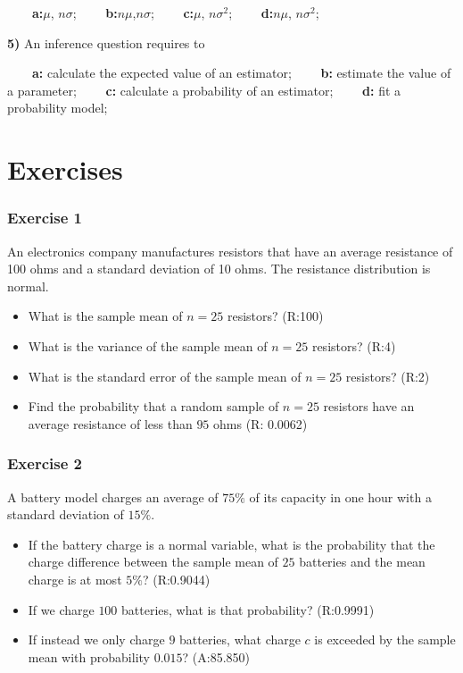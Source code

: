 \documentclass[
]{book}
\begin{document}
\textbf{\(\qquad\)a:}\(\mu\), \(n\sigma\);
\textbf{\(\qquad\)b:}\(n\mu\),\(n\sigma\);
\textbf{\(\qquad\)c:}\(\mu\), \(n\sigma^2\);
\textbf{\(\qquad\)d:}\(n\mu\), \(n\sigma^2\);

\textbf{5)} An inference question requires to

\textbf{\(\qquad\)a:} calculate the expected value of an estimator;
\textbf{\(\qquad\)b:} estimate the value of a parameter;
\textbf{\(\qquad\)c:} calculate a probability of an estimator;
\textbf{\(\qquad\)d:} fit a probability model;

\hypertarget{exercises-8}{%
\section{Exercises}\label{exercises-8}}

\hypertarget{exercise-1-7}{%
\subsubsection{Exercise 1}\label{exercise-1-7}}

An electronics company manufactures resistors that have an average resistance of 100 ohms and
a standard deviation of 10 ohms. The resistance distribution is normal.

\begin{itemize}
\item
  What is the sample mean of \(n=25\) resistors? (R:100)
\item
  What is the variance of the sample mean of \(n=25\) resistors? (R:4)
\item
  What is the standard error of the sample mean of \(n=25\) resistors? (R:2)
\item
  Find the probability
  that a random sample of \(n = 25\) resistors have an average resistance of less than \(95\) ohms (R: 0.0062)
\end{itemize}

\hypertarget{exercise-2-7}{%
\subsubsection{Exercise 2}\label{exercise-2-7}}

A battery model charges an average of \(75\%\) of its capacity in one hour with a standard deviation of \(15\%\).

\begin{itemize}
\item
  If the battery charge is a normal variable, what is the probability that the charge difference between the sample mean of \(25\) batteries and the mean charge is at most \(5\%\)? (R:0.9044)
\item
  If we charge \(100\) batteries, what is that probability? (R:0.9991)
\item
  If instead we only charge \(9\) batteries, what charge \(c\) is exceeded by the sample mean with probability \(0.015\)? (A:85.850)
\end{itemize}
\end{document}
